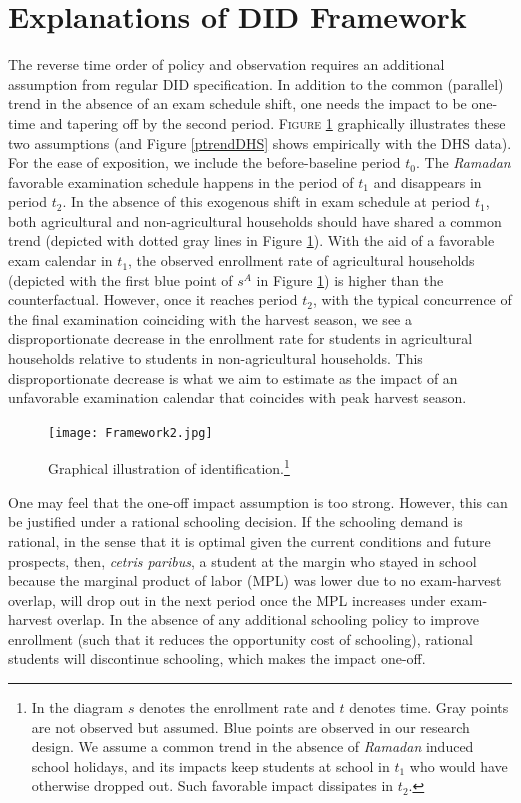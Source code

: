 \documentclass[12pt,letterpaper]{article}
\newcommand{\0}{\ensuremath{\mbox{\boldmath $0$}}}
\begin{document}
\pagebreak

\section{Explanations of DID Framework}\label{app_a2}

The reverse time order of policy and observation requires an additional assumption from regular DID specification. In addition to the common (parallel) trend in the absence of an exam schedule shift, one needs the impact to be one-time and tapering off by the second period. \textsc{\small Figure \ref{ididea}} graphically illustrates these two assumptions (and Figure \ref{ptrendDHS} shows empirically with the DHS data). For the ease of exposition, we include the before-baseline period $t_{0}$. The \textit{Ramadan} favorable examination schedule happens in the period of $t_{1}$ and disappears in period $t_{2}$. In the absence of this exogenous shift in exam schedule at period $t_{1}$, both agricultural and non-agricultural households should have shared a common trend (depicted with dotted gray lines in Figure \ref{ididea}). With the aid of a favorable exam calendar in $t_{1}$, the observed enrollment rate of agricultural households (depicted with the first blue point of $s^{A}$ in Figure \ref{ididea}) is higher than the counterfactual. However, once it reaches period $t_{2}$, with the typical concurrence of the final examination coinciding with the harvest season, we see a disproportionate decrease in the enrollment rate for students in agricultural households relative to students in non-agricultural households. This disproportionate decrease is what we aim to estimate as the impact of an unfavorable examination calendar that coincides with peak harvest season.

\begin{figure}[h!]
\centering
\texttt{[image: Framework2.jpg]}\\
\caption{Graphical illustration of identification.\footnote{In the diagram $s$ denotes the enrollment rate and $t$ denotes time. Gray points are not observed but assumed. Blue points are observed in our research design. We assume a common trend in the absence of \textit{Ramadan} induced school holidays, and its impacts keep students at school in $t_{1}$ who would have otherwise dropped out. Such favorable impact dissipates in $t_{2}$.}}
\label{ididea}
\end{figure}



One may feel that the one-off impact assumption is too strong. However, this can be justified under a rational schooling decision. If the schooling demand is rational, in the sense that it is optimal given the current conditions and future prospects, then, \textit{cetris paribus}, a student at the margin who stayed in school because the marginal product of labor (MPL) was lower due to no exam-harvest overlap, will drop out in the next period once the MPL increases under exam-harvest overlap. In the absence of any additional schooling policy to improve enrollment (such that it reduces the opportunity cost of schooling), rational students will discontinue schooling, which makes the impact one-off. 
\end{document}
